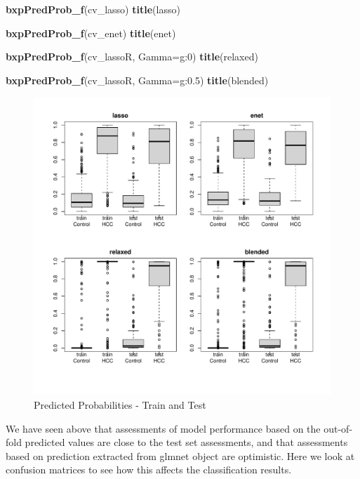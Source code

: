\documentclass[
]{book}
\newenvironment{Shaded}{\begin{snugshade}}{\end{snugshade}}
\newcommand{\DataTypeTok}[1]{\textcolor[rgb]{0.13,0.29,0.53}{#1}}
\newcommand{\KeywordTok}[1]{\textcolor[rgb]{0.13,0.29,0.53}{\textbf{#1}}}
\newcommand{\NormalTok}[1]{#1}
\newcommand{\StringTok}[1]{\textcolor[rgb]{0.31,0.60,0.02}{#1}}
\begin{document}
\begin{Shaded}
\begin{Highlighting}[]
\KeywordTok{bxpPredProb\_f}\NormalTok{(cv\_lasso)}
\KeywordTok{title}\NormalTok{(}\StringTok{\textquotesingle{}lasso\textquotesingle{}}\NormalTok{)}

\KeywordTok{bxpPredProb\_f}\NormalTok{(cv\_enet)}
\KeywordTok{title}\NormalTok{(}\StringTok{\textquotesingle{}enet\textquotesingle{}}\NormalTok{)}

\KeywordTok{bxpPredProb\_f}\NormalTok{(cv\_lassoR, }\DataTypeTok{Gamma=}\StringTok{\textquotesingle{}g:0\textquotesingle{}}\NormalTok{)}
\KeywordTok{title}\NormalTok{(}\StringTok{\textquotesingle{}relaxed\textquotesingle{}}\NormalTok{)}

\KeywordTok{bxpPredProb\_f}\NormalTok{(cv\_lassoR, }\DataTypeTok{Gamma=}\StringTok{\textquotesingle{}g:0.5\textquotesingle{}}\NormalTok{)}
\KeywordTok{title}\NormalTok{(}\StringTok{\textquotesingle{}blended\textquotesingle{}}\NormalTok{)}
\end{Highlighting}
\end{Shaded}

\begin{figure}
\centering
\includegraphics{Static/figures/fitPrevalByGroup-1.pdf}
\caption{\label{fig:fitPrevalByGroup}Predicted Probabilities - Train and Test}
\end{figure}

We have seen above that assessments of model performance based on the out-of-fold
predicted values are close to the test set assessments, and that
assessments based on prediction extracted from glmnet object are optimistic.
Here we look at confusion matrices to see how this affects the
classification results.
\end{document}
